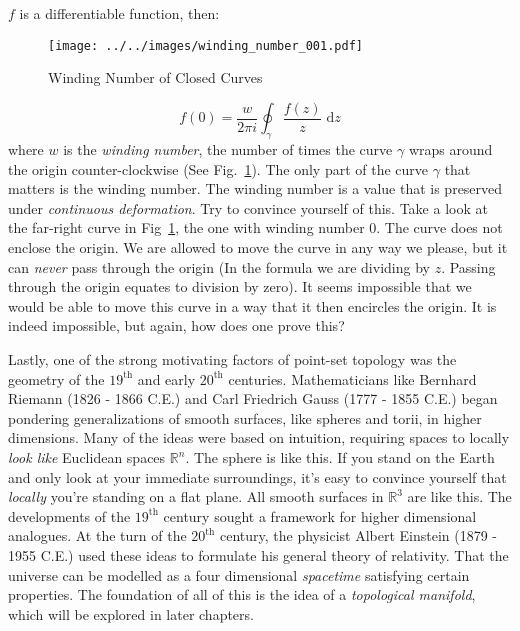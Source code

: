     $f$ is a differentiable function, then:
    \begin{figure}
        \centering
        \texttt{[image: ../../images/winding\_number\_001.pdf]}
        \caption{Winding Number of Closed Curves}
        \label{fig:winding_number_001}
    \end{figure}
    \begin{equation}
        f(0)=\frac{w}{2\pi{i}}\oint_{\gamma}\frac{f(z)}{z}\;\textrm{d}z
    \end{equation}
    where $w$ is the \textit{winding number}, the number of times the curve
    $\gamma$ wraps around the origin counter-clockwise
    (See Fig.~\ref{fig:winding_number_001}). The only part of the curve
    $\gamma$ that matters is the winding number. The winding number is a value
    that is preserved under \textit{continuous deformation}. Try to convince
    yourself of this. Take a look at the far-right curve in
    Fig~\ref{fig:winding_number_001}, the one with winding number 0. The curve
    does not enclose the origin. We are allowed to move the curve in any way
    we please, but it can \textit{never} pass through the origin
    (In the formula we are dividing by $z$. Passing through the origin equates
    to division by zero). It seems impossible that we would be able to move this
    curve in a way that it then encircles the origin. It is indeed impossible,
    but again, how does one prove this?
    \par\hfill\par
    Lastly, one of the strong motivating factors of point-set topology was
    the geometry of the $19^{\textrm{th}}$ and early
    $20^{\textrm{th}}$ centuries. Mathematicians like
    Bernhard Riemann (1826 - 1866 C.E.) and Carl Friedrich Gauss
    (1777 - 1855 C.E.) began pondering generalizations of smooth surfaces,
    like spheres and torii, in higher dimensions. Many of the ideas were based
    on intuition, requiring spaces to locally \textit{look like} Euclidean
    spaces $\mathbb{R}^{n}$. The sphere is like this. If you stand on the Earth
    and only look at your immediate surroundings, it's easy to convince yourself
    that \textit{locally} you're standing on a flat plane. All smooth surfaces
    in $\mathbb{R}^{3}$ are like this. The developments of the
    $19^{\textrm{th}}$ century sought a framework for higher dimensional
    analogues. At the turn of the $20^{\textrm{th}}$ century, the physicist
    Albert Einstein (1879 - 1955 C.E.) used these ideas to formulate his
    general theory of relativity. That the universe can be modelled as a
    four dimensional \textit{spacetime} satisfying certain properties. The
    foundation of all of this is the idea of a \textit{topological manifold},
    which will be explored in later chapters.
